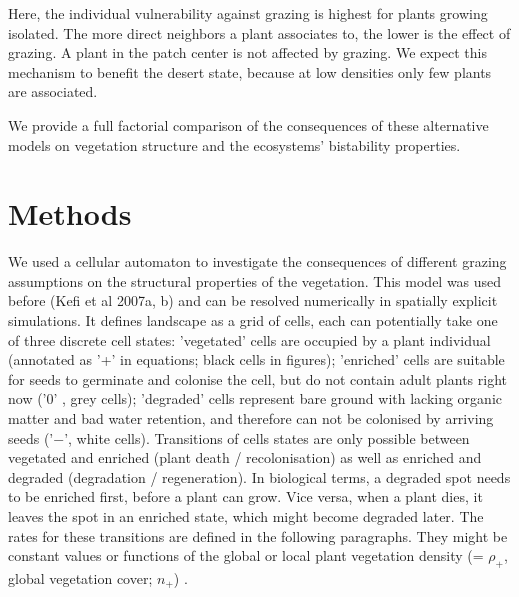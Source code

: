 
Here, the individual vulnerability against grazing is highest for plants growing isolated. The more direct neighbors a plant associates to, the lower is the effect of grazing. A plant in the patch center is not affected by grazing. We expect this mechanism to benefit the desert state, because at low densities only few plants are associated.


 We provide a full factorial comparison of the consequences of these alternative models on vegetation structure and the ecosystems' bistability properties.


\section{Methods}
We used a cellular automaton to investigate the consequences of different grazing assumptions on the structural properties of the vegetation. This model was used before (Kefi et al 2007a, b) and can be resolved numerically in spatially explicit simulations. It defines landscape as a grid of cells, each can potentially take one of three discrete cell states: 'vegetated' cells are occupied by a plant individual (annotated as '+' in equations; black cells in figures); 'enriched' cells are suitable for seeds to germinate and colonise the cell, but do not contain adult plants right now  ('0' , grey cells); 'degraded' cells represent bare ground with lacking organic matter and bad water retention, and therefore can not be colonised by arriving seeds  ('$-$', white cells).
Transitions of cells states are only possible between vegetated and enriched (plant death / recolonisation) as well as enriched and degraded (degradation / regeneration). In biological terms, a degraded spot needs to be enriched first, before a plant can grow. Vice versa, when a plant dies, it leaves the spot in an enriched state, which might become degraded later. The rates for these transitions are defined in the following paragraphs. They might be constant values or functions of the global or local plant vegetation density (= $\rho_+$, global vegetation cover; $n_+$) .

